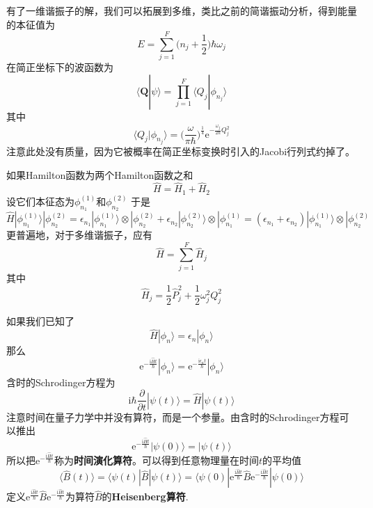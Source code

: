 \documentclass[12pt]{article}
\begin{document}
    有了一维谐振子的解，我们可以拓展到多维，类比之前的简谐振动分析，得到能量的本征值为
    \[ E = \sum_{j=1}^F \bigg(n_j+\frac 12\bigg)\hbar \omega_j \]
    在简正坐标下的波函数为
    \[ \langle \bm{Q}|\psi \rangle = \prod_{j=1}^F \langle Q_j | \phi_{n_j} \rangle \]
    其中
    \[ \langle Q_j|\phi_{n_j} \rangle = \bigg(\frac {\omega}{\pi \hbar}\bigg)^{\frac 14} \mathrm{e}^{-\frac {\omega_j}{2\hbar} Q_j^2} \]
    注意此处没有质量，因为它被概率在简正坐标变换时引入的Jacobi行列式约掉了。

    如果Hamilton函数为两个Hamilton函数之和
    \[ \hat{H} = \hat{H}_1 + \hat{H}_2 \]
    设它们本征态为$\phi_{n_1}^{(1)}$和$\phi_{n_2}^{(2)}$
    于是
    \[\hat{H} |\phi_{n_1}^{(1)} \rangle |\phi_{n_2}^{(2)} = \epsilon_{n_1}|\phi_{n_1}^{(1)} \rangle \otimes |\phi_{n_2}^{(2)} + \epsilon_{n_2}|\phi_{n_2}^{(2)} \rangle \otimes |\phi_{n_1}^{(1)} = (\epsilon_{n_1}+\epsilon_{n_2})|\phi_{n_1}^{(1)} \rangle \otimes |\phi_{n_2}^{(2)}\]
    更普遍地，对于多维谐振子，应有
    \[ \hat{H} = \sum_{j=1}^F \hat{H}_j \]
    其中 
    \[ \hat{H}_j = \frac 12 \hat{P}_j^2 + \frac 12 \omega_j^2 Q_j^2 \]

    如果我们已知了
    \[ \hat{H}|\phi_n\rangle = \epsilon_n|\phi_n\rangle \]
    那么
    \[ \mathrm{e}^{-\frac {\mathrm{i}\hat{H}t}{\hbar}}|\phi_n\rangle = \mathrm{e}^{-\frac {\mathrm{i}\epsilon_n t}{\hbar}}|\phi_n\rangle \]
    含时的Schrodinger方程为
    \[ \mathrm{i}\hbar \frac {\partial}{\partial t}|\psi(t)\rangle = \hat{H} |\psi(t)\rangle \]
    注意时间在量子力学中并没有算符，而是一个参量。由含时的Schrodinger方程可以推出
    \[ \mathrm{e}^{-\frac {\mathrm{i}\hat{H}t}{\hbar}}|\psi(0)\rangle = |\psi(t) \rangle \]
    所以把$\mathrm{e}^{-\frac {\mathrm{i}\hat{H}t}{\hbar}}$称为\textbf{时间演化算符}。可以得到任意物理量在时间$t$的平均值 
    \[ \langle \hat{B}(t) \rangle = \langle \psi(t)|\hat{B} | \psi(t) \rangle = \langle \psi(0) |\mathrm{e}^{\frac {\mathrm{i}\hat{H}t}{\hbar}} \hat{B} \mathrm{e}^{-\frac {\mathrm{i}\hat{H}t}{\hbar}}|\psi(0) \rangle \]
    定义$\mathrm{e}^{\frac {\mathrm{i}\hat{H}t}{\hbar}} \hat{B} \mathrm{e}^{-\frac {\mathrm{i}\hat{H}t}{\hbar}}$为算符$\hat{B}$的\textbf{Heisenberg算符}.
\end{document}
